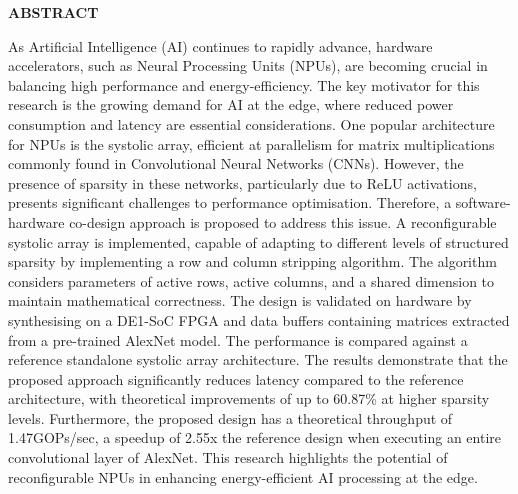 \documentclass[12pt, a4paper, ukenglish]{article}
\begin{document}
\vspace{2em}
\begin{center}
    {\large \textbf{\name}}
\end{center}

\vspace{2em}
\begin{center}
    {\large \textbf{\scshape ABSTRACT}}
\end{center}



As Artificial Intelligence (AI) continues to rapidly advance, hardware accelerators, such as Neural Processing Units (NPUs), are becoming crucial in balancing high performance and energy-efficiency. The key motivator for this research is the growing demand for AI at the edge, where reduced power consumption and latency are essential considerations. One popular architecture for NPUs is the systolic array, efficient at parallelism for matrix multiplications commonly found in Convolutional Neural Networks (CNNs). However, the presence of sparsity in these networks, particularly due to ReLU activations, presents significant challenges to performance optimisation. Therefore, a software-hardware co-design approach is proposed to address this issue. A reconfigurable systolic array is implemented, capable of adapting to different levels of structured sparsity by implementing a row and column stripping algorithm. The algorithm considers parameters of active rows, active columns, and a shared dimension to maintain mathematical correctness. The design is validated on hardware by synthesising on a DE1-SoC FPGA and data buffers containing matrices extracted from a pre-trained AlexNet model. The performance is compared against a reference standalone systolic array architecture. The results demonstrate that the proposed approach significantly reduces latency compared to the reference architecture, with theoretical improvements of up to 60.87\% at higher sparsity levels. Furthermore, the proposed design has a theoretical throughput of 1.47GOPs/sec, a speedup of 2.55x the reference design when executing an entire convolutional layer of AlexNet. This research highlights the potential of reconfigurable NPUs in enhancing energy-efficient AI processing at the edge.
\end{document}
